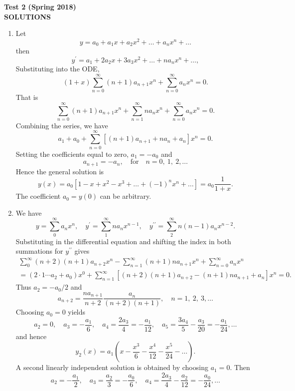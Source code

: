 \documentclass[11pt,a4paper]{article}
\begin{document}
	\begin{center}
		\textbf{\large Test 2 (Spring 2018)}\\[0.15cm]
		\textbf{\large SOLUTIONS}
	\end{center}
	\begin{enumerate}
		\item Let
		$$
		y = a_0 + a_1x + a_2x^2 + \ldots + a_nx^n + \ldots
		$$
		then
		$$
		y^\prime = a_1 + 2a_2x + 3a_3x^2 + \ldots + na_nx^n + \ldots,
		$$
		Substituting into the ODE,
		$$
		(1 + x)\sum_{n = 0}^\infty (n + 1)a_{n + 1}x^n + \sum_{n = 0}^\infty a_nx^n = 0.
		$$
		That is
		$$
		\sum_{n = 0}^\infty(n + 1)a_{n + 1}x^n + \sum_{n = 1}^\infty na_nx^n + \sum_{n = 0}^\infty a_nx^n = 0.
		$$
		Combining the series, we have
		$$
		a_1 + a_0 + \sum_{n = 0}^\infty[(n + 1)a_{n + 1} + na_n + a_n]x^n = 0.
		$$
		Setting the coefficients equal to zero, $a_1 = -a_0$ and
		$$
		a_{n + 1} = -a_n,\quad \text{for}\quad n = 0,\ 1,\ 2,\ldots
		$$
		Hence the general solution is
		$$
		y(x) = a_0[1 - x + x^2 - x^3 + \ldots + (-1)^nx^n + \ldots] = a_0\frac{1}{1+x}.
		$$
		The coefficient $a_0 = y(0)$ can be arbitrary.
		\item We have
		$$
		y = \sum_0^\infty a_nx^n,\quad y^\prime = \sum_1^\infty na_nx^{n-1},\quad y^{\prime\prime} = \sum_2^\infty n(n-1)a_nx^{n - 2}.
		$$
		Substituting in the differential equation and shifting the index in both summations for $y^{\prime\prime}$ gives
		\begin{equation*}
			\begin{split}
				\sum_0^\infty(n + 2)(n + 1)a_{n+2}x^n - \sum_{n = 1}^\infty(n + 1)na_{n + 1}x^n + \sum_{n = 0}^\infty a_nx^n\\
				= (2 \cdot 1 \cdots a_2 + a_0)x^0 + \sum_{n = 1}^\infty[(n + 2)(n + 1)a_{n+2} - (n+1)na_{n+1} + a_n]x^n = 0.
			\end{split}
		\end{equation*}
		Thus $a_2 = -a_0/2$ and
		$$
		a_{n + 2} = \frac{na_{n + 1}}{n + 2}\frac{a_n}{(n + 2)(n + 1)},\quad n = 1,\ 2,\ 3,\ldots
		$$
		Choosing $a_0 = 0$ yields
		$$
		a_2 = 0,\quad a_3 = -\frac{a_1}{6},\quad a_4 = \frac{2a_3}{4} = -\frac{a_1}{12},\quad a_5 = \frac{3a_4}{5} - \frac{a_3}{20} = -\frac{a_1}{24},\ldots
		$$
		and hence
		$$
		y_2(x) = a_1\left(x - \frac{x^3}{6} - \frac{x^4}{12} - \frac{x^5}{24} - \ldots\right).
		$$
		A second linearly independent solution is obtained by choosing $a_1 = 0$. Then
		$$
		a_2 = -\frac{a_1}{2},\quad a_3 = \frac{a_2}{3} = -\frac{a_0}{6},\quad a_4 = \frac{2a_3}{4} - \frac{a_2}{12} = -\frac{a_0}{24},\ldots
$$
\end{enumerate}
\end{document}
